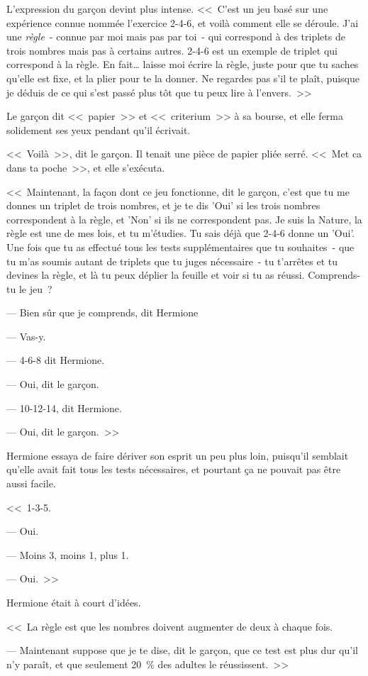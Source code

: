L'expression du garçon devint plus intense. <<~C'est un jeu basé sur une expérience connue nommée l'exercice 2-4-6, et voilà comment elle se déroule. J'ai une \emph{règle}~- connue par moi mais pas par toi~- qui correspond à des triplets de trois nombres mais pas à certains autres. 2-4-6 est un exemple de triplet qui correspond à la règle. En fait… laisse moi écrire la règle, juste pour que tu saches qu'elle est fixe, et la plier pour te la donner. Ne regardes pas s'il te plaît, puisque je déduis de ce qui s'est passé plus tôt que tu peux lire à l'envers.~>>

Le garçon dit <<~papier~>> et <<~criterium~>> à sa bourse, et elle ferma solidement ses yeux pendant qu'il écrivait.

<<~Voilà~>>, dit le garçon. Il tenait une pièce de papier pliée serré. <<~Met ca dans ta poche~>>, et elle s'exécuta.

<<~Maintenant, la façon dont ce jeu fonctionne, dit le garçon, c'est que tu me donnes un triplet de trois nombres, et je te dis 'Oui' si les trois nombres correspondent à la règle, et 'Non' si ils ne correspondent pas. Je suis la Nature, la règle est une de mes lois, et tu m'étudies. Tu sais déjà que 2-4-6 donne un 'Oui'. Une fois que tu as effectué tous les tests supplémentaires que tu souhaites~- que tu m'as soumis autant de triplets que tu juges nécessaire~- tu t'arrêtes et tu devines la règle, et là tu peux déplier la feuille et voir si tu as réussi. Comprends-tu le jeu~?

--- Bien sûr que je comprends, dit Hermione

--- Vas-y.

--- 4-6-8 dit Hermione.

--- Oui, dit le garçon.

--- 10-12-14, dit Hermione.

--- Oui, dit le garçon.~>>

Hermione essaya de faire dériver son esprit un peu plus loin, puisqu'il semblait qu'elle avait fait tous les tests nécessaires, et pourtant ça ne pouvait pas être aussi facile.

<<~1-3-5.

--- Oui.

--- Moins 3, moins 1, plus 1.

--- Oui.~>>

Hermione était à court d'idées.

<<~La règle est que les nombres doivent augmenter de deux à chaque fois.

--- Maintenant suppose que je te dise, dit le garçon, que ce test est plus dur qu'il n'y paraît, et que seulement 20~\% des adultes le réussissent.~>>

